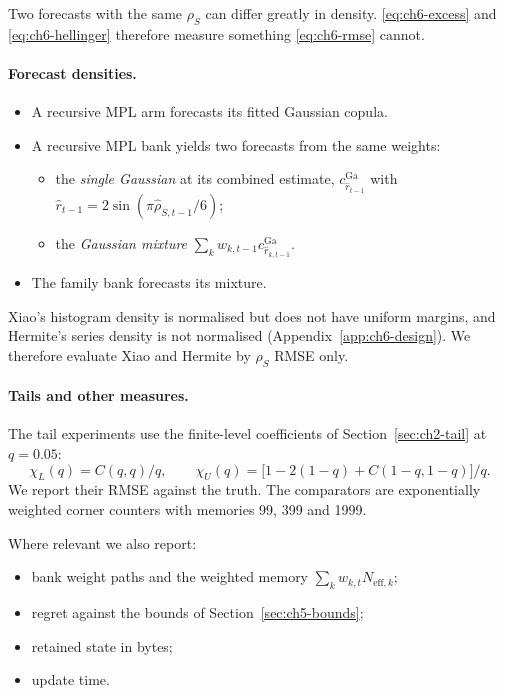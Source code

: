 Two forecasts with the same $\rho_S$ can differ greatly in density.
\eqref{eq:ch6-excess} and \eqref{eq:ch6-hellinger} therefore measure something \eqref{eq:ch6-rmse} cannot.

\paragraph{Forecast densities.}
\begin{itemize}
  \item A recursive MPL arm forecasts its fitted Gaussian copula.
  \item A recursive MPL bank yields two forecasts from the same weights:
    \begin{itemize}
      \item the \emph{single Gaussian} at its combined estimate, $c^{\mathrm{Ga}}_{\widehat r_{t-1}}$ with $\widehat r_{t-1} = 2\sin(\pi\widehat\rho_{S,t-1}/6)$;
      \item the \emph{Gaussian mixture} $\sum_k w_{k,t-1}c^{\mathrm{Ga}}_{\widehat r_{k,t-1}}$.
    \end{itemize}
  \item The family bank forecasts its mixture.
\end{itemize}
Xiao's histogram density is normalised but does not have uniform margins, and Hermite's series density is not normalised (Appendix~\ref{app:ch6-design}).
We therefore evaluate Xiao and Hermite by $\rho_S$ RMSE only.

\paragraph{Tails and other measures.}
The tail experiments use the finite-level coefficients of Section~\ref{sec:ch2-tail} at $q = 0.05$:
\begin{equation}\label{eq:ch6-chi}
  \chi_L(q) = C(q,q)/q, \qquad \chi_U(q) = \bigl[1 - 2(1-q) + C(1-q, 1-q)\bigr]/q.
\end{equation}
We report their RMSE against the truth.
The comparators are exponentially weighted corner counters with memories 99, 399 and 1999.

Where relevant we also report:
\begin{itemize}
  \item bank weight paths and the weighted memory $\sum_k w_{k,t}N_{\mathrm{eff},k}$;
  \item regret against the bounds of Section~\ref{sec:ch5-bounds};
  \item retained state in bytes;
  \item update time.
\end{itemize}

